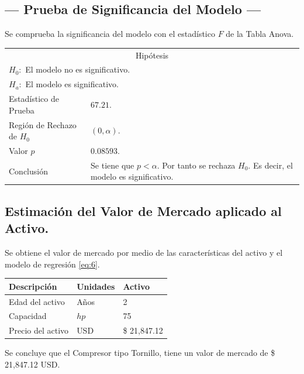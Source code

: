 \subsection{\centering --- Prueba de Significancia del Modelo ---} %
Se comprueba la significancia del modelo con el estadístico \(F\) de la Tabla Anova.
\begin{center}
  \begin{tabular}{|l|p{6cm}|}
    \cline{1-2}
    \multicolumn{2}{|c|}{Hipótesis}\\ \cline{1-2}
    \multicolumn{2}{|l|}{\(H_0:\) El modelo no es significativo.} \\ 
    \multicolumn{2}{|l|}{\(H_a:\) El modelo es significativo.} \\ \cline{1-2}
    Estadístico de Prueba & \(67.21\).\\ \cline{1-2} 
		Región de Rechazo de \(H_0\) & \((0, \alpha )\).\\ \cline{1-2} 
    Valor \(p\) & \(0.08593\).\\ \cline{1-2} 
    Conclusión & Se tiene que \(p<\alpha\). \newline 
		Por tanto se rechaza \(H_0\). \newline 
		Es decir, el modelo es significativo.\\ \cline{1-2} 
  \end{tabular}
\end{center} 

\subsection{\centering Estimación del Valor de Mercado aplicado al Activo.} %
Se obtiene el valor de mercado por medio de las características del activo y el modelo de regresión \eqref{eq:6}.
\begin{center}
  \begin{tabular}{|l|l|l|}
    \hline 
		Descripción   & Unidades  & Activo \\ \hline 
    Edad del activo    & Años      & 2      \\ \hline 
		Capacidad  & \(hp\) & 75   \\ \hline 
		Precio del activo   & USD       & \$ 21,847.12     \\ \hline 
  \end{tabular}
\end{center} 
Se concluye que el Compresor tipo Tornillo, tiene un valor de mercado de 
\$ 21,847.12  USD.


\espacio

